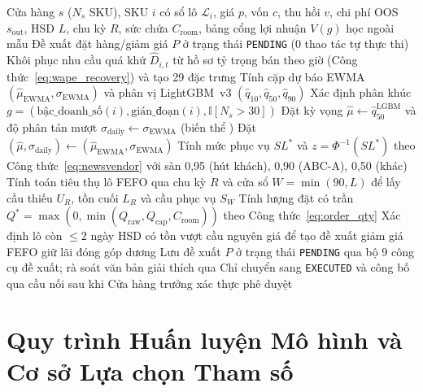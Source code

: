\begin{algorithm}[htbp]
\caption{Đặt hàng Hàng Tươi sống Định tuyến Cổng Lợi nhuận (\texttt{B-Gate}), Trần FEFO \& HITL (\texttt{ops\_chest})}
\label{alg:ops_chest_newsvendor}
\footnotesize
\begin{algorithmic}[1]
\Require Cửa hàng $s$ ($N_s$ SKU), SKU $i$ có sổ lô $\mathcal{L}_i$, giá $p$, vốn $c$, thu hồi $v$, chi phí OOS $s_{\text{out}}$, HSD $L$, chu kỳ $R$, sức chứa $C_{\text{room}}$, bảng cổng lợi nhuận $V(g)$ học ngoài mẫu
\Ensure Đề xuất đặt hàng/giảm giá $P$ ở trạng thái \texttt{PENDING} (0 thao tác tự thực thi)
\State Khôi phục nhu cầu quá khứ $\hat{D}_{i,t}$ từ hồ sơ tỷ trọng bán theo giờ (Công thức~\ref{eq:wape_recovery}) và tạo 29 đặc trưng
\State Tính cặp dự báo EWMA $(\hat{\mu}_{\text{EWMA}}, \sigma_{\text{EWMA}})$ và phân vị LightGBM~v3 $(\hat{q}_{10}, \hat{q}_{50}, \hat{q}_{90})$
\State Xác định phân khúc $g = (\text{bậc\_doanh\_số}(i), \text{gián\_đoạn}(i), \mathbb{I}[N_s > 30])$
    \State Đặt kỳ vọng $\hat{\mu} \gets \hat{q}_{50}^{\text{LGBM}}$ và độ phân tán mượt $\sigma_{\text{daily}} \gets \sigma_{\text{EWMA}}$ (biến thể )
\Else
    \State Đặt $(\hat{\mu}, \sigma_{\text{daily}}) \gets (\hat{\mu}_{\text{EWMA}}, \sigma_{\text{EWMA}})$
\EndIf
\State Tính mức phục vụ $SL^*$ và $z = \Phi^{-1}(SL^*)$ theo Công thức~\ref{eq:newsvendor} với sàn 0,95 (hút khách), 0,90 (ABC-A), 0,50 (khác)
\State Tính toán tiêu thụ lô FEFO qua chu kỳ $R$ và cửa sổ $W = \min(90, L)$ để lấy cầu thiếu $U_R$, tồn cuối $L_R$ và cầu phục vụ $S_W$
\State Tính lượng đặt có trần $Q^* = \max(0, \min(Q_{\text{raw}}, Q_{\text{cap}}, C_{\text{room}}))$ theo Công thức~\ref{eq:order_qty}
\State Xác định lô còn $\le 2$ ngày HSD có tồn vượt cầu nguyên giá để tạo đề xuất giảm giá FEFO giữ lãi đóng góp dương
\State Lưu đề xuất $P$ ở trạng thái \texttt{PENDING} qua bộ 9 công cụ đề xuất; rà soát văn bản giải thích qua 
\State Chỉ chuyển sang \texttt{EXECUTED} và công bố qua cầu nối  sau khi Cửa hàng trưởng xác thực phê duyệt
\end{algorithmic}
\end{algorithm}

\section{Quy trình Huấn luyện Mô hình và Cơ sở Lựa chọn Tham số}

